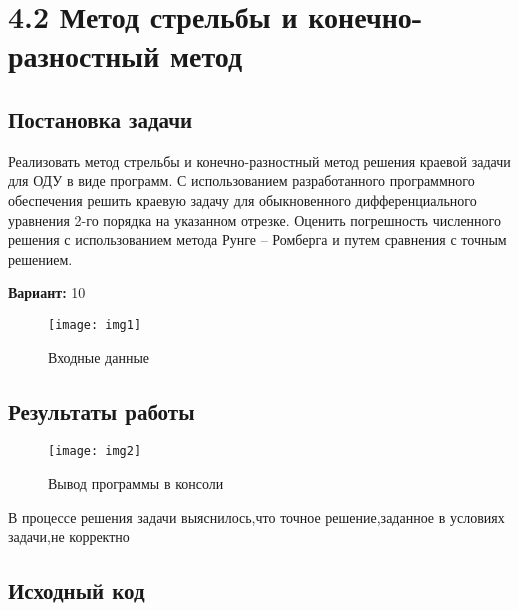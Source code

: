\section* {4.2 Метод стрельбы и конечно-разностный метод}

\subsection{Постановка задачи}
Реализовать метод стрельбы и конечно-разностный метод решения краевой задачи для ОДУ в виде программ. С использованием разработанного программного обеспечения решить краевую задачу для обыкновенного дифференциального уравнения 2-го порядка на указанном отрезке. Оценить погрешность численного решения с использованием метода Рунге – Ромберга и путем сравнения с точным решением. 

{\bfseries Вариант:} 10

\begin{figure}[h!]
\centering
\texttt{[image: img1]}
\caption{Входные данные}
\end{figure}

\subsection{Результаты работы}
\begin{figure}[h!]
\centering
\texttt{[image: img2]}
\caption{Вывод программы в консоли}
\end{figure}
В процессе решения задачи выяснилось,что точное решение,заданное в условиях задачи,не корректно

\pagebreak

\subsection{Исходный код}
% 

% 
% 
% 
